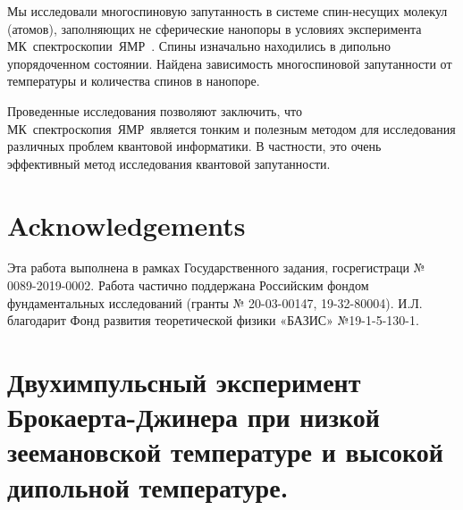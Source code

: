 \documentclass[utf8]{jetp}
\begin{document}
Мы исследовали многоспиновую запутанность в системе спин-несущих молекул (атомов), заполняющих не сферические нанопоры в условиях эксперимента МК~спектроскопии~ЯМР~.
Спины изначально находились в дипольно упорядоченном состоянии.
Найдена зависимость многоспиновой запутанности от температуры и количества спинов в нанопоре.

Проведенные исследования позволяют заключить, что МК~спектроскопия~ЯМР~является тонким и полезным методом для исследования различных проблем квантовой информатики.
В частности, это очень эффективный метод исследования квантовой запутанности.


\section{Acknowledgements}
Эта работа выполнена в рамках Государственного задания, госрегистраци № 0089-2019-0002.
Работа частично поддержана Российским фондом фундаментальных исследований (гранты № 20-03-00147, 19-32-80004).
И.Л. благодарит Фонд развития теоретической физики «БАЗИС» №19-1-5-130-1.



\appendix
\section{Двухимпульсный эксперимент Брокаерта-Джинера при низкой зеемановской температуре и высокой дипольной температуре.}
\end{document}
